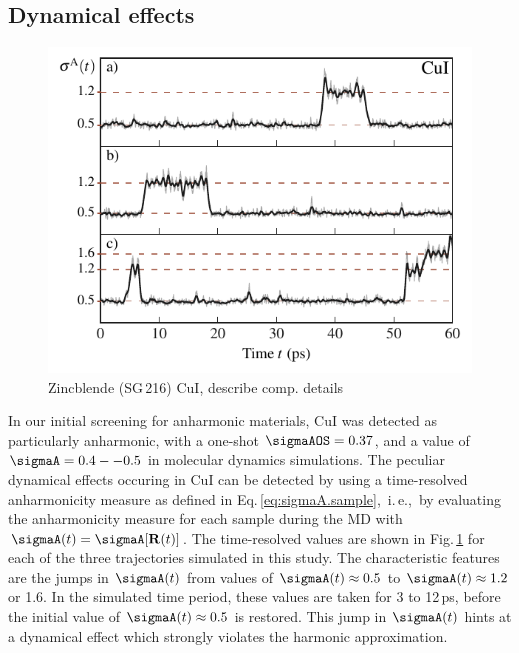 \subsection{Dynamical effects}
\label{sec:defects.CuI}
\begin{figure}
	\includegraphics[width=\textwidth]{./data/plots/defects/216.02.CuI/sigma_vs_time.pdf}
	\caption{Zincblende (SG\,216) CuI, describe comp. details}
	\label{fig:defects.CuI}
\end{figure}
\noindent
In our initial screening for anharmonic materials, CuI was detected as particularly anharmonic, with a one-shot $\sigmaAOS = 0.37$, and a value of $\sigmaA = 0.4--0.5$ in molecular dynamics simulations. The peculiar dynamical effects occuring in CuI can be detected by using a time-resolved anharmonicity measure as defined in Eq.\,\eqref{eq:sigmaA.sample},~i.\,e.,~by evaluating the anharmonicity measure for each sample during the MD with $\sigmaA(t) = \sigmaA [{\bf R} (t)]$. The time-resolved values are shown in Fig.\,\ref{fig:defects.CuI} for each of the three trajectories simulated in this study.
The characteristic features are the jumps in $\sigmaA (t)$ from values of $\sigmaA (t) \approx 0.5$ to $\sigmaA (t) \approx 1.2$ or 1.6. In the simulated time period, these values are taken for 3 to 12\,ps, before the initial value of $\sigmaA (t) \approx 0.5$ is restored. This jump in $\sigmaA (t)$ hints at a dynamical effect which strongly violates the harmonic approximation. 

